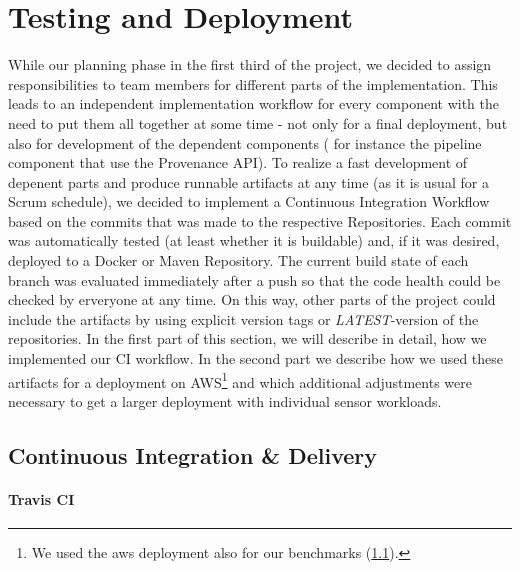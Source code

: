 \section{Testing and Deployment}
While our planning phase in the first third of the project, we decided to assign responsibilities to team members for different parts of the implementation.
This leads to an independent implementation workflow for every component with the need to put them all together at some time - not only for a final deployment, but also for development of the dependent components ( for instance the pipeline component that use the Provenance API).
To realize a fast development of depenent parts and produce runnable artifacts at any time (as it is usual for a Scrum schedule), we decided to implement a Continuous Integration Workflow based on the commits that was made to the respective Repositories. Each commit was automatically tested (at least whether it is buildable) and, if it was desired, deployed to a Docker or Maven Repository. The current build state of each branch was evaluated immediately after a push so that the code health could be checked by erveryone at any time.
On this way, other parts of the project could include the artifacts by using explicit version tags or \emph{LATEST}-version of the repositories. In the first part of this section, we will describe in detail, how we implemented our CI workflow. In the second part we describe how we used these artifacts for a deployment on AWS\footnote{We used the aws deployment also for our benchmarks (\ref{}).} and which additional adjustments were necessary to get a larger deployment with individual sensor workloads.

\subsection{Continuous Integration \& Delivery}

\paragraph*{Travis CI}
%

